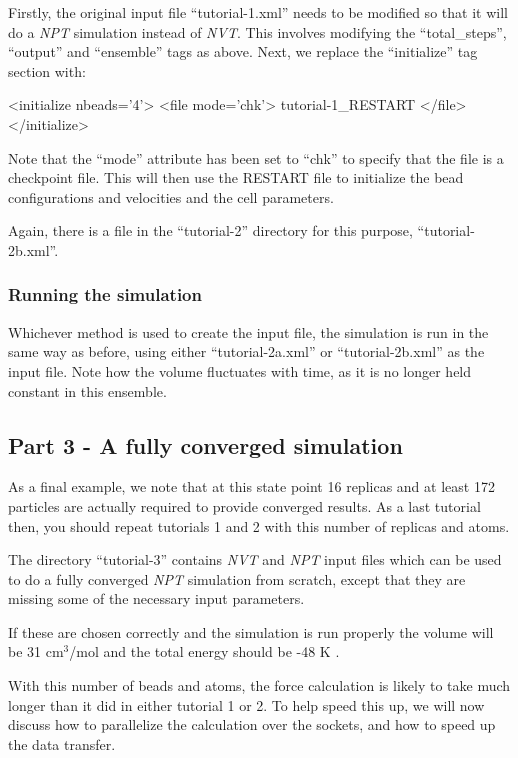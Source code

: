 \documentclass[11pt,english,fleqn]{report}
\newenvironment{code}{%
\footnotesize 
\verbatim
}{
\endverbatim
\normalsize
}
\begin{document}
Firstly, the original input file {}``tutorial-1.xml'' needs to
be modified so that
it will do a \emph{NPT} simulation instead of \emph{NVT}. This involves modifying
the {}``total\_steps'', {}``output'' and {}``ensemble'' tags as
above. Next, we replace the {}``initialize'' tag section with:

\begin{code}
<initialize nbeads='4'>
   <file mode='chk'> tutorial-1_RESTART </file>
</initialize>
\end{code}

Note that the {}``mode'' attribute has been set to {}``chk''
to specify that the file is a checkpoint file.
This will then use the RESTART file to initialize the bead
configurations and velocities and the cell parameters.

Again, there is a file in the {}``tutorial-2'' directory
for this purpose, {}``tutorial-2b.xml''.

\subsubsection{Running the simulation}

Whichever method is used to create the input file, the simulation
is run in the same way as before, using either
{}``tutorial-2a.xml'' or {}``tutorial-2b.xml'' as the input file. 
Note how the volume fluctuates with time, as it is no longer held
constant in this ensemble.

\subsection{Part 3 - A fully converged simulation}

As a final example, we note that at this state point 16 replicas
and at least 172 particles are actually 
required to provide converged results.
As a last tutorial then, you should repeat tutorials 1 and 2 with
this number of replicas and atoms. 

The directory {}``tutorial-3'' contains 
\emph{NVT} and \emph{NPT} input files which can be used to do a fully converged
\emph{NPT} simulation from scratch, except that they are missing some
of the necessary input parameters.

If these are chosen correctly and the simulation is run properly
the volume will be 31 \(\textrm{cm}^3\)/mol and the total energy
should be -48 K \cite{mart+99jcp}.

With this number of beads and atoms, the force calculation is likely
to take much longer than it did in either tutorial 1 or 2.
To help speed this up, we will now discuss how to parallelize the
calculation over the sockets, and how to speed up the data transfer.
\end{document}
